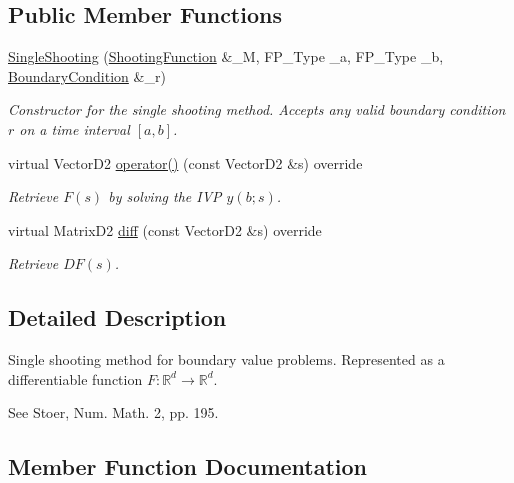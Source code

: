 \subsection*{Public Member Functions}
\begin{DoxyCompactItemize}
\item 
\mbox{\label{classSingleShooting_ad9dc199aea00e22bcbeb4e92a256ad4f}} 
\hyperlink{classSingleShooting_ad9dc199aea00e22bcbeb4e92a256ad4f}{Single\+Shooting} (\hyperlink{classShootingFunction}{Shooting\+Function} \&\+\_\+M, F\+P\+\_\+\+Type \+\_\+a, F\+P\+\_\+\+Type \+\_\+b, \hyperlink{classBoundaryCondition}{Boundary\+Condition} \&\+\_\+r)
\begin{DoxyCompactList}\small\item\em Constructor for the single shooting method. Accepts any valid boundary condition $r$ on a time interval $[a, b]$. \end{DoxyCompactList}\item 
\mbox{\label{classSingleShooting_a6ffb84c5c62c86691154d41f67ff303a}} 
virtual Vector\+D2 \hyperlink{classSingleShooting_a6ffb84c5c62c86691154d41f67ff303a}{operator()} (const Vector\+D2 \&s) override
\begin{DoxyCompactList}\small\item\em Retrieve $F(s)$ by solving the I\+VP $y(b; s)$. \end{DoxyCompactList}\item 
virtual Matrix\+D2 \hyperlink{classSingleShooting_a29ada16c267ba2658c991092b59ce49d}{diff} (const Vector\+D2 \&s) override
\begin{DoxyCompactList}\small\item\em Retrieve $DF(s)$. \end{DoxyCompactList}\end{DoxyCompactItemize}


\subsection{Detailed Description}
Single shooting method for boundary value problems. Represented as a differentiable function $F: \mathbb{R}^d \rightarrow \mathbb{R}^d$.

See Stoer, Num. Math. 2, pp. 195. 

\subsection{Member Function Documentation}
\mbox{\label{classSingleShooting_a29ada16c267ba2658c991092b59ce49d}} 

